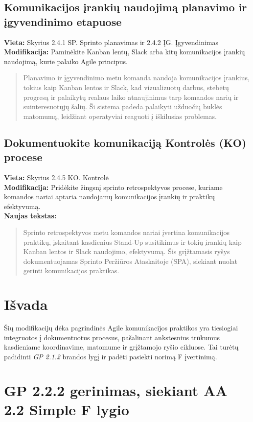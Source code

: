 \documentclass{article}
\begin{document}
\subsection*{Komunikacijos įrankių naudojimą planavimo ir įgyvendinimo etapuose}
\textbf{Vieta:} Skyrius 2.4.1 SP. Sprinto planavimas ir 2.4.2 ĮG. Įgyvendinimas \\
\textbf{Modifikacija:} Paminėkite Kanban lentų, Slack arba kitų komunikacijos įrankių naudojimą, kurie palaiko Agile principus. 
\begin{quote}
Planavimo ir įgyvendinimo metu komanda naudoja komunikacijos įrankius, tokius kaip Kanban lentos ir Slack, kad vizualizuotų darbus, stebėtų progresą ir palaikytų realaus laiko atnaujinimus tarp komandos narių ir suinteresuotųjų šalių. Ši sistema padeda palaikyti užduočių būklės matomumą, leidžiant operatyviai reaguoti į iškilusias problemas.
\end{quote}

\subsection*{Dokumentuokite komunikaciją Kontrolės (KO) procese}
\textbf{Vieta:} Skyrius 2.4.5 KO. Kontrolė \\
\textbf{Modifikacija:} Pridėkite žingsnį sprinto retrospektyvos procese, kuriame komandos nariai aptaria naudojamų komunikacijos įrankių ir praktikų efektyvumą. \\
\textbf{Naujas tekstas:}
\begin{quote}
Sprinto retrospektyvos metu komandos nariai įvertina komunikacijos praktikų, įskaitant kasdienius Stand-Up susitikimus ir tokių įrankių kaip Kanban lentos ir Slack naudojimo, efektyvumą. Šis grįžtamasis ryšys dokumentuojamas Sprinto Peržiūros Ataskaitoje (SPA), siekiant nuolat gerinti komunikacijos praktikas.
\end{quote}

\section*{Išvada}
Šių modifikacijų dėka pagrindinės Agile komunikacijos praktikos yra tiesiogiai integruotos į dokumentuotus procesus, pašalinant ankstesnius trūkumus kasdieniame koordinavime, matomume ir grįžtamojo ryšio cikluose. Tai turėtų padidinti \textit{GP 2.1.2} brandos lygį ir padėti pasiekti norimą F įvertinimą.

\section*{GP 2.2.2 gerinimas, siekiant AA 2.2 Simple F lygio}
\end{document}

